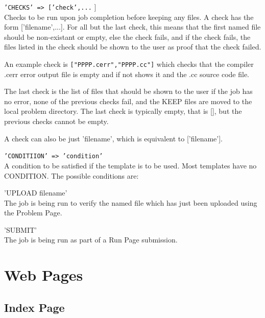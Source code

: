 \documentclass[12pt]{article}
\newenvironment{indpar}[1][0.4in]%
	{\begin{list}{}%
		     {\setlength{\itemsep}{0in}%
		      \setlength{\topsep}{0in}%
		      \setlength{\parsep}{1ex}%
		      \setlength{\labelwidth}{#1}%
		      \setlength{\leftmargin}{#1}%
		      \addtolength{\leftmargin}{\labelsep}}%
	 \item}%
	{\end{list}}
\newenvironment{itemlist}[1][0.2in]%
	{\begin{list}{}{\setlength{\labelwidth}{#1}%
		        \setlength{\leftmargin}{\labelwidth}%
		        \addtolength{\leftmargin}{+0.2in}%
		        \addtolength{\linewidth}{-\labelwidth}%
		        \addtolength{\linewidth}{-0.2in}%
		        \renewcommand{\makelabel}[1]{##1\hfill}}
	 \raggedright}%
	{\end{list}}
\begin{document}
\begin{indpar}[0.2in]
\begin{itemlist}
\item[\tt 'CHECKS' => ['check',...]] ~ \\
Checks to be run upon job completion before keeping any files.
A check has the form ['filename',...].   For all but the last
check, this means that the first named file should be non-existant
or empty, else the check fails, and if the check fails,
the files listed in the check should be shown to the user as
proof that the check failed.

An example check is \verb|["PPPP.cerr","PPPP.cc"]| which checks
that the compiler .cerr error output file is empty and if not
shows it and the .cc source code file.

The last check is the list of files
that should be shown to the user if the job has no error, none
of the previous checks fail, and the KEEP files are moved to the
local problem directory.  The last check is typically empty, that is [],
but the previous checks cannot be empty.

A check can also be just 'filename',
which is equivalent to ['filename'].

\item[\tt 'CONDITIION' => 'condition'] ~ \\
A condition to be satisfied if the template is to be used.
Most templates have no CONDITION.  The possible conditions are:
\begin{indpar}
\begin{itemlist}
\item['UPLOAD filename'] ~ \\
The job is being run to verify the named file which has
just been uploaded using the Problem Page.
\item['SUBMIT'] ~ \\
The job is being run as part of a Run Page submission.
\end{itemlist}
\end{indpar}

\end{itemlist}
\end{indpar}


\newpage

\section{Web Pages}

\subsection{Index Page}
\end{document}

